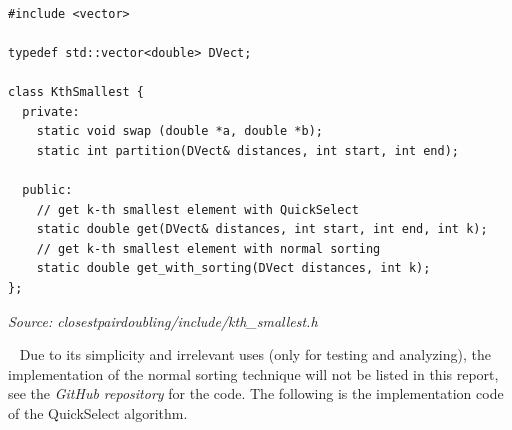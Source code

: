 \documentclass[12pt,english,]{article}
\begin{document}
~

\newpage

\begin{lstlisting}
#include <vector>

typedef std::vector<double> DVect;

class KthSmallest {
  private:
    static void swap (double *a, double *b);
    static int partition(DVect& distances, int start, int end);

  public:
    // get k-th smallest element with QuickSelect
    static double get(DVect& distances, int start, int end, int k);
    // get k-th smallest element with normal sorting 
    static double get_with_sorting(DVect distances, int k);
};
\end{lstlisting}
\vspace{-9truemm}
\begin{minipage}{1\textwidth}
  \begin{flushright}
  {\footnotesize \emph{Source: closestpairdoubling/include/kth\_smallest.h}\par}
  \end{flushright}
\end{minipage}
\vspace{0.5truemm}

~ Due to its simplicity and irrelevant uses (only for testing and
analyzing), the implementation of the normal sorting technique will not
be listed in this report, see the \emph{GitHub repository} for the code.
The following is the implementation code of the QuickSelect algorithm.

~
\end{document}
